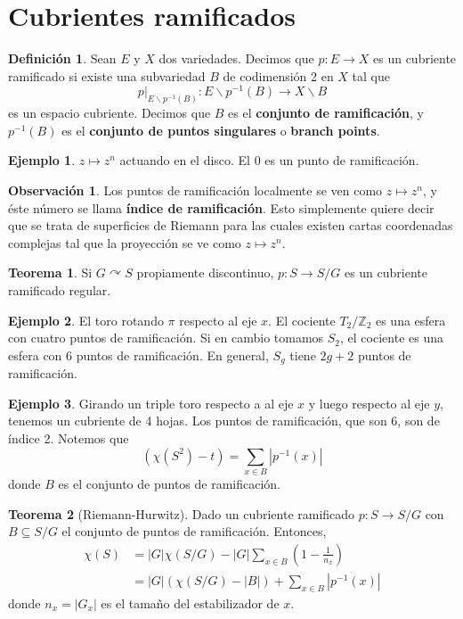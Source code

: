 \documentclass[spanish]{article}
\theoremstyle{definition}
\newtheorem*{defn}{Definición}
\newtheorem*{obs}{Observación}
\newtheorem*{teo}{Teorema}
\newtheorem*{ejem}{Ejemplo}
\newcommand{\Z}{\mathbb{Z}}
\begin{document}
\section{Cubrientes ramificados}
\begin{defn}
	Sean $E$ y $X$ dos variedades. Decimos que $p:E\to X$ es un cubriente ramificado si existe una subvariedad $B$ de codimensión 2 en $X$ tal que 
	\[p|_{E\backslash p^{-1}(B)}:E\backslash p^{-1}(B)\to X\backslash B\]
	es un espacio cubriente. Decimos que $B$ es el \textbf{conjunto de ramificación}, y $p^{-1}(B)$ es el \textbf{conjunto de puntos singulares} o \textbf{branch points}.
\end{defn}
\begin{ejem}
	$z\mapsto z^n$ actuando en el disco. El 0 es un punto de ramificación.
\end{ejem}
\begin{obs}
	Los puntos de ramificación localmente se ven como $z\mapsto z^n$, y éste número se llama \textbf{índice de ramificación}. Esto simplemente quiere decir que se trata de superficies de Riemann para las cuales existen cartas coordenadas complejas tal que la proyección se ve como $z\mapsto z^n$.
\end{obs}
\begin{teo}
	Si $G\curvearrowright S$ propiamente discontinuo, $p:S\to S/G$ es un cubriente ramificado regular.
\end{teo}
\begin{ejem}
	El toro rotando $\pi$ respecto al eje $x$. El cociente $T_2/\Z_2$ es una esfera con cuatro puntos de ramificación. Si en cambio tomamos $S_2$, el cociente es una esfera con 6 puntos de ramificación. En general, $S_g$ tiene $2g+2$ puntos de ramificación.
\end{ejem}
\begin{ejem}
	Girando un triple toro respecto a al eje $x$ y luego respecto al eje $y$, tenemos un cubriente de 4 hojas. Los puntos de ramificación, que son 6, son de índice 2. Notemos que 
	\[(\chi(S^2)-t)=\sum_{x\in B}|p^{-1}(x)|\]
	donde $B$ es el conjunto de puntos de ramificación.
\end{ejem}
\begin{teo}[Riemann-Hurwitz]
	Dado un cubriente ramificado $p:S\to S/G$ con $B\subseteq S/G$ el conjunto de puntos de ramificación. Entonces,
	\begin{align*}
		\chi(S)&=|G|\chi(S/G)-|G|\sum_{x\in B}\left(1-\frac{1}{n_x}\right)\\
		&=|G|(\chi(S/G)-|B|)+\sum_{x\in B}|p^{-1}(x)|
	\end{align*}
	donde $n_x=|G_x|$ es el tamaño del estabilizador de $x$.
\end{teo}
\end{document}

